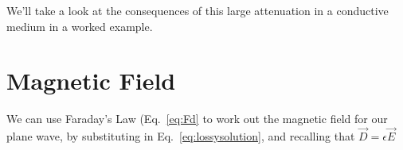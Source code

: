 \documentclass{tufte-handout}
\begin{document}
We'll take a look at the consequences of this large attenuation in a conductive medium in a worked example.

\section{Magnetic Field}
We can use Faraday's Law (Eq.~\ref{eq:Fd} to work out the magnetic field for our plane wave, by substituting in Eq.~\ref{eq:lossysolution}, and recalling that $\vec{D} = \epsilon\vec{E}$
\end{document}
